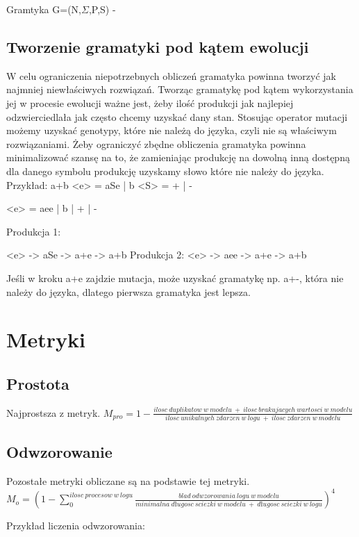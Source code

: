 Gramtyka G=(N,$\Sigma$,P,S) - 

\subsection{Tworzenie gramatyki pod kątem ewolucji}

W celu ograniczenia niepotrzebnych obliczeń gramatyka powinna tworzyć jak najmniej niewłaściwych rozwiązań. 
Tworząc gramatykę pod kątem wykorzystania jej w procesie ewolucji ważne jest, żeby ilość produkcji jak najlepiej odzwierciedlała jak często chcemy uzyskać dany stan.
Stosując operator mutacji możemy uzyskać genotypy, które nie należą do języka, czyli nie są właściwym rozwiązaniami. Żeby ograniczyć zbędne obliczenia gramatyka powinna minimalizować szansę na to, że zamieniając produkcję na dowolną inną dostępną dla danego symbolu produkcję uzyskamy słowo które nie należy do języka.
Przykład:
a+b
<e> = aSe | b
<S> = + | -

<e> = aee | b | + | -

Produkcja 1:

<e> -> aSe -> a+e -> a+b
Produkcja 2:
<e> -> aee -> a+e -> a+b

Jeśli w kroku a+e zajdzie mutacja, może uzyskać gramatykę np. a+-, która nie należy do języka, dlatego pierwsza gramatyka jest lepsza.


\section{Metryki}
\label{sec:metryki}
\cite{doi:10.1142/S0218843014400012}
\subsection{Prostota}
Najprostsza z metryk.
$M_{pro} = 1 - \frac{ilosc\ duplikatow\ w\ modelu\ +\ ilosc\ brakujacych\ wartosci\ w\ modelu}{ilosc\ unikalnych\ zdarzen\ w\ logu\ +\ ilosc\ zdarzen\ w\ modelu}$
\subsection{Odwzorowanie}
Pozostałe metryki obliczane są na podstawie tej metryki. 
$M_o = (1 - \sum_{0}^{ilosc\ procesow\ w\ logu} \frac{blad\ odwzorowania\ logu\ w\ modelu}{minimalna\ długosc\ sciezki\ w\ modelu\ +\ długosc\ sciezki\ w\ logu})^4$

Przykład liczenia odwzorowania:

